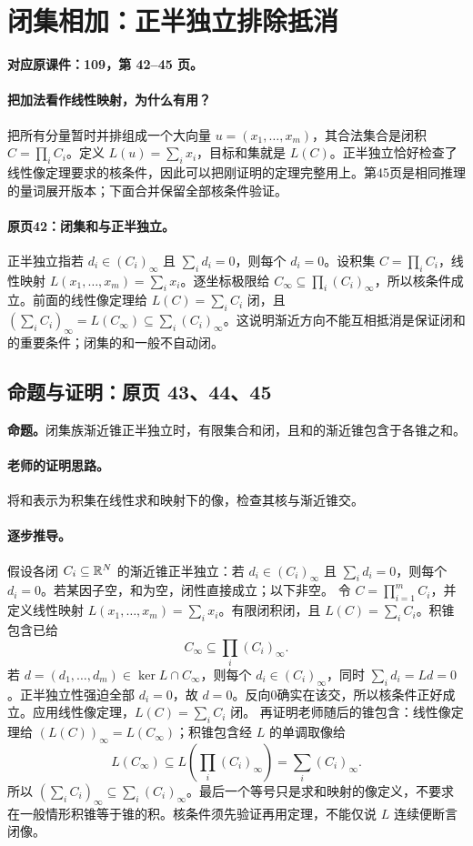 \clearpage\section{闭集相加：正半独立排除抵消}\label{g:109:42}

\textbf{对应原课件：109，第 42--45 页。}


\paragraph{把加法看作线性映射，为什么有用？}
把所有分量暂时并排组成一个大向量 $u=(x_1,\ldots,x_m)$，其合法集合是闭积 $C=\prod_iC_i$。定义 $L(u)=\sum_i x_i$，目标和集就是 $L(C)$。正半独立恰好检查了线性像定理要求的核条件，因此可以把刚证明的定理完整用上。第45页是相同推理的量词展开版本；下面合并保留全部核条件验证。


\paragraph{原页42：闭集和与正半独立。}正半独立指若 $d_i\in(C_i)_\infty$ 且 $\sum_i d_i=0$，则每个 $d_i=0$。设积集 $C=\prod_iC_i$，线性映射 $L(x_1,\ldots,x_m)=\sum_i x_i$。逐坐标极限给 $C_\infty\subseteq\prod_i(C_i)_\infty$，所以核条件成立。前面的线性像定理给 $L(C)=\sum_iC_i$ 闭，且 $(\sum_i C_i)_\infty=L(C_\infty)\subseteq\sum_i(C_i)_\infty$。这说明渐近方向不能互相抵消是保证闭和的重要条件；闭集的和一般不自动闭。



\subsection{命题与证明：原页 43、44、45}

\textbf{命题。}闭集族渐近锥正半独立时，有限集合和闭，且和的渐近锥包含于各锥之和。

\paragraph{老师的证明思路。}将和表示为积集在线性求和映射下的像，检查其核与渐近锥交。

\paragraph{逐步推导。}
假设各闭 $C_i\subseteq\mathbb{R}^N$ 的渐近锥正半独立：若 $d_i\in(C_i)_\infty$ 且 $\sum_i d_i=0$，则每个 $d_i=0$。若某因子空，和为空，闭性直接成立；以下非空。
令 $C=\prod_{i=1}^mC_i$，并定义线性映射 $L(x_1,\ldots,x_m)=\sum_i x_i$。有限闭积闭，且 $L(C)=\sum_iC_i$。积锥包含已给
\[C_\infty\subseteq\prod_i(C_i)_\infty.\]
若 $d=(d_1,\ldots,d_m)\in\ker L\cap C_\infty$，则每个 $d_i\in(C_i)_\infty$，同时 $\sum_id_i=Ld=0$。正半独立性强迫全部 $d_i=0$，故 $d=0$。反向0确实在该交，所以核条件正好成立。应用线性像定理，$L(C)=\sum_iC_i$ 闭。
再证明老师随后的锥包含：线性像定理给 $(L(C))_\infty=L(C_\infty)$；积锥包含经 $L$ 的单调取像给
\[L(C_\infty)\subseteq L\left(\prod_i(C_i)_\infty\right)=\sum_i(C_i)_\infty.\]
所以 $(\sum_iC_i)_\infty\subseteq\sum_i(C_i)_\infty$。最后一个等号只是求和映射的像定义，不要求在一般情形积锥等于锥的积。核条件须先验证再用定理，不能仅说 $L$ 连续便断言闭像。


